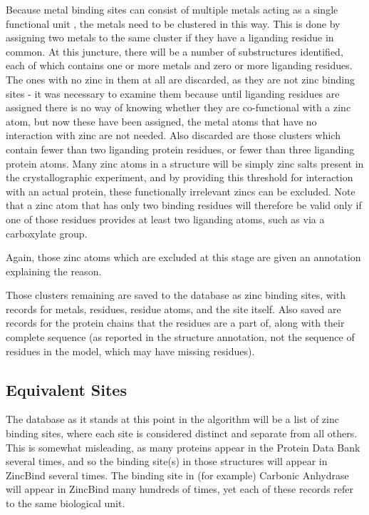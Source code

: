 Because metal binding sites can consist of multiple metals acting as a single functional unit , the metals need to be clustered in this way. This is done by assigning two metals to the same cluster if they have a liganding residue in common. At this juncture, there will be a number of substructures identified, each of which contains one or more metals and zero or more liganding residues. The ones with no zinc in them at all are discarded, as they are not zinc binding sites - it was necessary to examine them because until liganding residues are assigned there is no way of knowing whether they are co-functional with a zinc atom, but now these have been assigned, the metal atoms that have no interaction with zinc are not needed. Also discarded are those clusters which contain fewer than two liganding protein residues, or fewer than three liganding protein atoms. Many zinc atoms in a structure will be simply zinc salts present in the crystallographic experiment, and by providing this threshold for interaction with an actual protein, these functionally irrelevant zincs can be excluded. Note that a zinc atom that has only two binding residues will therefore be valid only if one of those residues provides at least two liganding atoms, such as via a carboxylate group.

Again, those zinc atoms which are excluded at this stage are given an annotation explaining the reason.

Those clusters remaining are saved to the database as zinc binding sites, with records for metals, residues, residue atoms, and the site itself. Also saved are records for the protein chains that the residues are a part of, along with their complete sequence (as reported in the structure annotation, not the sequence of residues in the model, which may have missing residues).

\subsection{Equivalent Sites}

The database as it stands at this point in the algorithm will be a list of zinc binding sites, where each site is considered distinct and separate from all others. This is somewhat misleading, as many proteins appear in the Protein Data Bank several times, and so the binding site(s) in those structures will appear in ZincBind several times. The binding site in (for example) Carbonic Anhydrase will appear in ZincBind many hundreds of times, yet each of these records refer to the same biological unit.


